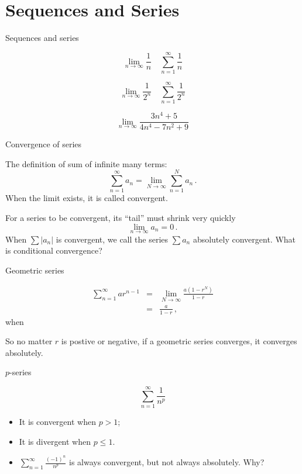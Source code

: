 \section{Sequences and Series}
\begin{frame}{Sequences and series}


\[
\lim_{n\to\infty}\frac{1}{n}\quad\sum_{n=1}^{\infty}\frac{1}{n}
\]



\pause{}


\[
\lim_{n\to\infty}\frac{1}{2^{n}}\quad\sum_{n=1}^{\infty}\frac{1}{2^{n}}
\]



\pause{}


\[
\lim_{n\to\infty}\frac{3n^{4}+5}{4n^{4}-7n^{2}+9}
\]


\end{frame}

\begin{frame}{Convergence of series}


The definition of sum of infinite many terms:
\[
\sum_{n=1}^{\infty}a_{n}=\lim_{N\to\infty}\sum_{n=1}^{N}a_{n}\,.
\]
When the limit exists, it is called convergent.


For a series to be convergent, its ``tail'' must shrink very quickly
\[
\lim_{n\to\infty}a_{n}=0\,.
\]
When $\sum\left|a_{n}\right|$ is convergent, we call the series $\sum a_{n}$
\alert{absolutely convergent}. What is \alert{conditional convergence}?

\end{frame}

\begin{frame}{Geometric series}


\begin{eqnarray*}
\sum_{n=1}^{\infty}ar^{n-1} & = & \lim_{N\to\infty}\frac{a\left(1-r^{N}\right)}{1-r}\\
 & = & \frac{a}{1-r}\,,
\end{eqnarray*}
when 


\pause{}


So no matter $r$ is postive or negative, if a geometric series converges,
it converges absolutely.

\end{frame}

\begin{frame}{$p$-series}


\[
\sum_{n=1}^{\infty}\frac{1}{n^{p}}
\]

\begin{itemize}
\item It is convergent when $p>1$;
\item It is divergent when $p\le1$.
\item $\sum_{n=1}^{\infty}\frac{\left(-1\right)^{n}}{n^{p}}$ is always
convergent, but not always absolutely. Why?
\end{itemize}
\end{frame}

